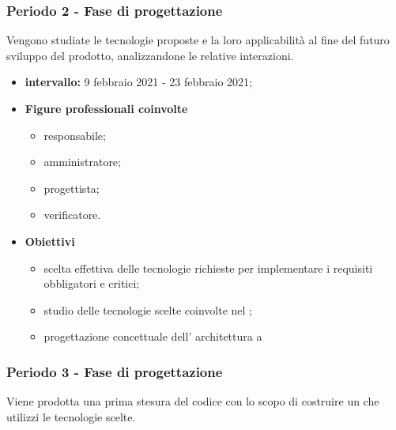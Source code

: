             \subsubsection{Periodo 2 - Fase di progettazione}
        
            Vengono studiate le tecnologie proposte e la loro applicabilità al fine del futuro sviluppo del prodotto, analizzandone le relative interazioni.
    
            \begin{itemize}
                \item \textbf{intervallo: }9 febbraio 2021 - 23 febbraio 2021;
            
            \item  \textbf{Figure professionali coinvolte}
                \begin{itemize}
                    \item responsabile;
                    \item amministratore;
                    \item progettista;
                    \item verificatore.
                \end{itemize}
    
                \item \textbf{Obiettivi}  
                            \begin{itemize}
                                \item scelta effettiva delle tecnologie richieste per implementare i requisiti obbligatori e critici;
                                \item studio delle tecnologie scelte coinvolte nel ;
                                \item progettazione concettuale dell' architettura a 
                            \end{itemize}
                \end{itemize}          
            
                \subsubsection{Periodo 3 - Fase di progettazione}
        
                 Viene prodotta una prima stesura del codice con lo scopo di costruire un  che utilizzi le tecnologie scelte.
        

